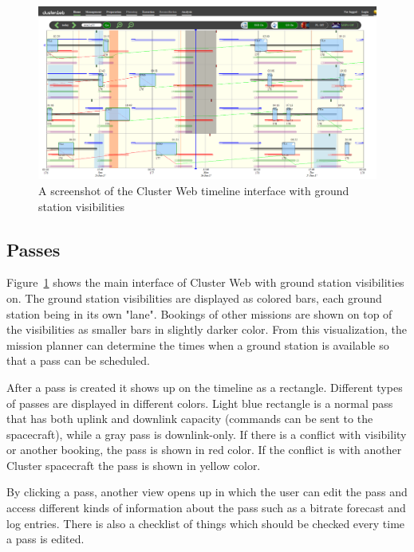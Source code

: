 \begin{figure}[ht]
  \begin{center}
    \includegraphics*[width=1\textwidth]{clusterweb_visibilities}
  \end{center}
  \caption{A screenshot of the Cluster Web timeline interface with ground station visibilities}
  \label{fig:clusterweb_visibilities}
\end{figure}

\subsection{Passes}
Figure~\ref{fig:clusterweb_visibilities} shows the main interface of Cluster Web with ground station visibilities on. The ground station visibilities are displayed as colored bars, each ground station being in its own "lane". Bookings of other missions are shown on top of the visibilities as smaller bars in slightly darker color. From this visualization, the mission planner can determine the times when a ground station is available so that a pass can be scheduled. 

After a pass is created it shows up on the timeline as a rectangle. Different types of passes are displayed in different colors. Light blue rectangle is a normal pass that has both uplink and downlink capacity (commands can be sent to the spacecraft), while a gray pass is downlink-only. If there is a conflict with visibility or another booking, the pass is shown in red color. If the conflict is with another Cluster spacecraft the pass is shown in yellow color.

By clicking a pass, another view opens up in which the user can edit the pass and access different kinds of information about the pass such as a bitrate forecast and log entries. There is also a checklist of things which should be checked every time a pass is edited.

